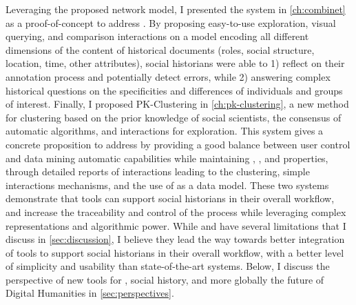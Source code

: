 Leveraging the proposed network model, I presented the \combinet system in \autoref{ch:combinet} as a proof-of-concept to address \qtwo.
By proposing easy-to-use exploration, visual querying, and comparison interactions on a model encoding all different dimensions of the content of historical documents (roles, social structure, location, time, other attributes), social historians were able to 1) reflect on their annotation process and potentially detect errors, while 2) answering complex historical questions on the specificities and differences of individuals and groups of interest.
Finally, I proposed PK-Clustering in \autoref{ch:pk-clustering}, a new method for clustering based on the prior knowledge of social scientists, the consensus of automatic algorithms, and interactions for exploration.
This system gives a concrete proposition to address \qthree by providing a good balance between user control and data mining automatic capabilities while maintaining \traceability, \simplicity, and \reality properties, through detailed reports of interactions leading to the clustering, simple interactions mechanisms, and the use of \modelplural as a data model.
These two systems demonstrate that \va tools can support social historians in their overall workflow, and increase the traceability and control of the process while leveraging complex representations and algorithmic power.
While \combinet and \pkclustering have several limitations that I discuss in \autoref{sec:discussion}, I believe they lead the way towards better integration of \va tools to support social historians in their overall workflow, with a better level of simplicity and usability than state-of-the-art systems.
Below, I discuss the perspective of new \va tools for \hsna, social history, and more globally the future of Digital Humanities in \autoref{sec:perspectives}.









